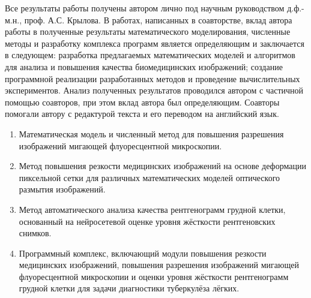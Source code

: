 {\contribution} 


Все результаты работы получены автором лично под научным руководством д.ф.-м.н., проф. А.С. Крылова. В работах, написанных в соавторстве, вклад автора работы в полученные результаты математического моделирования, численные методы и разработку комплекса программ является определяющим и заключается в следующем: разработка предлагаемых математических моделей и алгоритмов для анализа и повышения качества биомедицинских изображений; создание программной реализации разработанных методов и проведение вычислительных экспериментов. Анализ полученных результатов проводился автором с частичной помощью соавторов, при этом вклад автора был определяющим. Соавторы помогали автору с редактурой текста и его переводом на английский язык.


{}

\begin {enumerate}[beginpenalty=10000]
	\item Математическая модель и численный метод для повышения разрешения изображений мигающей флуоресцентной микроскопии.
	
	\item Метод повышения резкости медицинских изображений на основе деформации пиксельной сетки для различных математических моделей оптического размытия изображений.
	
	\item Метод автоматического анализа качества рентгенограмм грудной клетки, основанный на нейросетевой оценке уровня жёсткости рентгеновских снимков.
	
	\item Программный комплекс, включающий модули повышения резкости медицинских изображений, повышения разрешения изображений мигающей флуоресцентной микроскопии и оценки уровня жёсткости рентгенограмм грудной клетки для задачи диагностики туберкулёза лёгких.
\end {enumerate}
